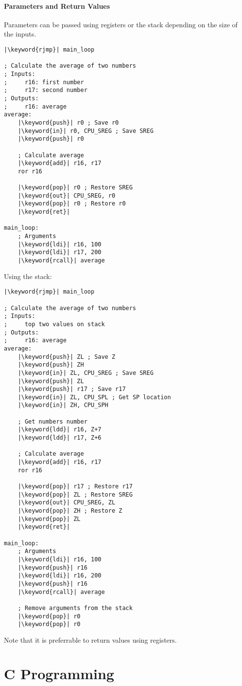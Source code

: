 \documentclass{report}
\newcommand{\keyword}[1]{\textcolor[rgb]{0.00,0.50,0.00}{\textbf{#1}}}
\begin{document}
\subsection{Parameters and Return Values}
Parameters can be passed using registers or the stack depending on the
size of the inputs.
\begin{verbatim}
|\keyword{rjmp}| main_loop

; Calculate the average of two numbers
; Inputs:
;     r16: first number
;     r17: second number
; Outputs:
;     r16: average
average:
    |\keyword{push}| r0 ; Save r0
    |\keyword{in}| r0, CPU_SREG ; Save SREG
    |\keyword{push}| r0

    ; Calculate average
    |\keyword{add}| r16, r17
    ror r16

    |\keyword{pop}| r0 ; Restore SREG
    |\keyword{out}| CPU_SREG, r0
    |\keyword{pop}| r0 ; Restore r0
    |\keyword{ret}|

main_loop:
    ; Arguments
    |\keyword{ldi}| r16, 100
    |\keyword{ldi}| r17, 200
    |\keyword{rcall}| average
\end{verbatim}
Using the stack:
\begin{verbatim}
|\keyword{rjmp}| main_loop

; Calculate the average of two numbers
; Inputs:
;     top two values on stack
; Outputs:
;     r16: average
average:
    |\keyword{push}| ZL ; Save Z
    |\keyword{push}| ZH
    |\keyword{in}| ZL, CPU_SREG ; Save SREG
    |\keyword{push}| ZL
    |\keyword{push}| r17 ; Save r17
    |\keyword{in}| ZL, CPU_SPL ; Get SP location
    |\keyword{in}| ZH, CPU_SPH

    ; Get numbers number
    |\keyword{ldd}| r16, Z+7
    |\keyword{ldd}| r17, Z+6

    ; Calculate average
    |\keyword{add}| r16, r17
    ror r16

    |\keyword{pop}| r17 ; Restore r17
    |\keyword{pop}| ZL ; Restore SREG
    |\keyword{out}| CPU_SREG, ZL
    |\keyword{pop}| ZH ; Restore Z
    |\keyword{pop}| ZL
    |\keyword{ret}|

main_loop:
    ; Arguments
    |\keyword{ldi}| r16, 100
    |\keyword{push}| r16
    |\keyword{ldi}| r16, 200
    |\keyword{push}| r16
    |\keyword{rcall}| average

    ; Remove arguments from the stack
    |\keyword{pop}| r0
    |\keyword{pop}| r0
\end{verbatim}
Note that it is preferrable to return values using registers.
\part{C Programming}
\end{document}
